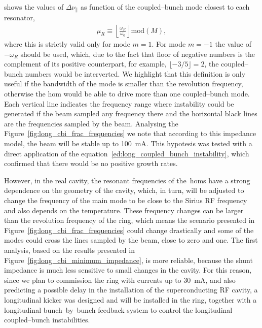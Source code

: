     shows the values of $\Delta\nu_\parallel$ as function of the coupled--bunch mode closest to each resonator,
    \begin{align}
        \mu_R \equiv \left\lfloor\frac{\omega_R}{\omega_0}\right\rfloor \text{mod}(M),
    \end{align}
    where this is strictly valid only for mode $m=1$. For mode $m=-1$ the value of $-\omega_R$ should be used, which, due to the fact that floor of negative numbers is the complement of its positive counterpart, for example, $\lfloor -3/5 \rfloor=2$, the coupled--bunch numbers would be interverted. We highlight that this definition is only useful if the bandwidth of the mode is smaller than the revolution frequency, otherwise the \gls{hom} would be able to drive more than one coupled--bunch mode. Each vertical line indicates the frequency range where instability could be generated if the beam sampled any frequency there and the horizontal black lines are the frequencies sampled by the beam.
    Analysing the Figure~\ref{fig:long_cbi_frac_frequencies} we note that according to this impedance model, the beam will be stable up to \SI{100}{\milli\ampere}. This hypotesis was tested with a direct application of the equation~\eqref{ed:long_coupled_bunch_instability}, which confirmed that there would be no positive growth rates.

    However, in the real cavity, the resonant frequencies of the~\glspl{hom} have a strong dependence on the geometry of the cavity, which, in turn, will be adjusted to change the frequency of the main mode to be close to the Sirius RF frequency and also depends on the temperature. These frequency changes can be larger than the revolution frequency of the ring, which means the scenario presented in Figure~\ref{fig:long_cbi_frac_frequencies} could change drastically and some of the modes could cross the lines sampled by the beam, close to zero and one. The first analysis, based on the results presented in Figure~\ref{fig:long_cbi_minimum_impedance}, is more reliable, because the shunt impedance is much less sensitive to small changes in the cavity. For this reason, since we plan to commission the ring with currents up to \SI{30}{\milli\ampere}, and also predicting a possible delay in the installation of the superconducting RF cavity, a longitudinal kicker was designed and will be installed in the ring, together with a longitudinal bunch--by--bunch feedback system to control the longitudinal coupled--bunch instabilities.

